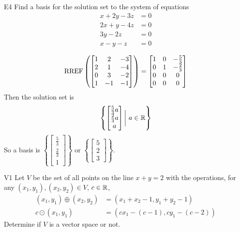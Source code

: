 \documentclass{sbgLAquiz}
\begin{document}
\begin{extract}\newpage\end{extract}
\begin{problem}{E4}
Find a basis for the solution set to the system of equations
\begin{align*}
x+2y-3z &= 0 \\
2x+y-4z &= 0 \\
3y -2z & = 0 \\
x -y -z &= 0
\end{align*}
\end{problem}
\begin{solution}
$$\operatorname{RREF} \left(\begin{bmatrix} 1 & 2 & -3 \\ 2 & 1 & -4 \\ 0 & 3 & -2 \\ 1 & -1 & -1 \end{bmatrix} \right) = \begin{bmatrix} 1 & 0 & -\frac{5}{3} \\ 0 & 1 & -\frac{2}{3} \\ 0 & 0 & 0 \\ 0 & 0 & 0 \end{bmatrix}$$
Then the solution set is 
$$\left\{ \begin{bmatrix} \frac{5}{3}a \\ \frac{2}{3}a \\ a \end{bmatrix} \bigg|\ a \in \mathbb{R} \right\}$$
So a basis is $\left\{ \begin{bmatrix} \frac{5}{3} \\ \frac{2}{3} \\ 1 \end{bmatrix} \right\}$ or $\left\{ \begin{bmatrix} 5 \\  2 \\ 3 \end{bmatrix} \right\}$.
\end{solution}
\begin{problem}{V1}
Let $V$ be the set of all points on the line $x+y=2$ with the operations, for any $(x_1,y_1), (x_2,y_2) \in V$, $c \in \mathbb{R}$,
\begin{align*}
(x_1,y_1) \oplus (x_2,y_2) &= (x_1+x_2-1,y_1+y_2-1) \\
c \odot (x_1,y_1) &= (cx_1-(c-1), cy_1-(c-2))
\end{align*}
Determine if $V$ is a vector space or not.
\end{problem}
\end{document}
